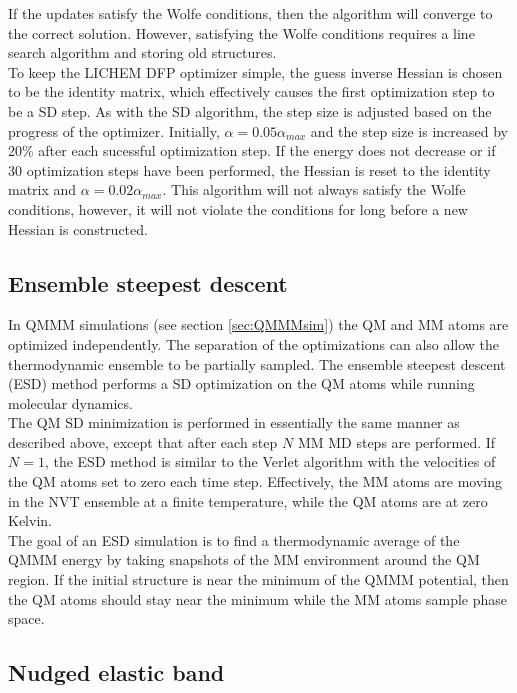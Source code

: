\documentclass[12pt]{report}
\begin{document}
If the updates satisfy the Wolfe conditions, then the algorithm will converge
to the correct solution. However, satisfying the Wolfe conditions requires
a line search algorithm and storing old structures. \\

To keep the LICHEM DFP optimizer simple, the guess inverse Hessian is chosen
to be the identity matrix, which effectively causes the first optimization
step to be a SD step. As with the SD algorithm, the step size is adjusted 
based on the progress of the optimizer. Initially, $\alpha=0.05\alpha_{max}$
and the step size is increased by 20\% after each sucessful optimization step.
If the energy does not decrease or if 30 optimization steps have been
performed, the Hessian is reset to the identity matrix and
$\alpha=0.02\alpha_{max}$. This algorithm will not always satisfy the Wolfe
conditions, however, it will not violate the conditions for long before a
new Hessian is constructed.

\subsection{Ensemble steepest descent}

In QMMM simulations (see section \ref{sec:QMMMsim}) the QM and MM atoms are
optimized independently. The separation of the optimizations can also allow
the thermodynamic ensemble to be partially sampled. The ensemble steepest
descent (ESD) method performs a SD optimization on the QM atoms while running
molecular dynamics. \\

The QM SD minimization is performed in essentially the same manner as described
above, except that after each step $N$ MM MD steps are performed. If $N=1$,
the ESD method is similar to the Verlet algorithm with the velocities of the
QM atoms set to zero each time step. Effectively, the MM atoms are moving in
the NVT ensemble at a finite temperature, while the QM atoms are at zero
Kelvin. \\

The goal of an ESD simulation is to find a thermodynamic average of the QMMM
energy by taking snapshots of the MM environment around the QM region. If the
initial structure is near the minimum of the QMMM potential, then the QM
atoms should stay near the minimum while the MM atoms sample phase space.

\subsection{Nudged elastic band}
\end{document}
